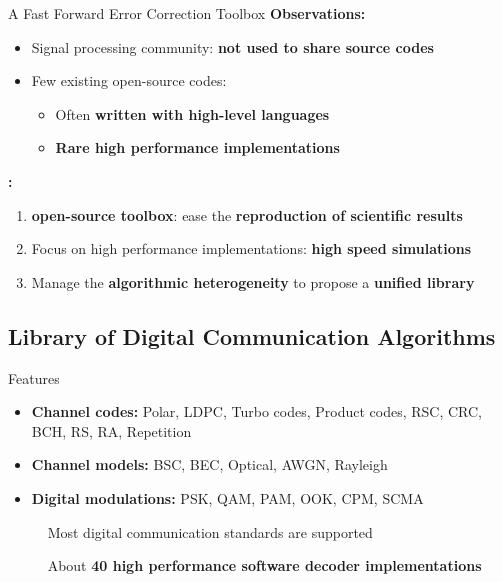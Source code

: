 \begin{frame}{A Fast Forward Error Correction Toolbox}
  \vfill
  \textbf{Observations:}

  \vspace{0.1cm}
  \begin{itemize}
    \item Signal processing community: \textbf{not used to share source codes}
    \item Few existing open-source codes:
    \begin{itemize}
      \item Often \textbf{written with high-level languages}
      \item \textbf{Rare high performance implementations}
    \end{itemize}
  \end{itemize}

  \vfill
  \pause
  \textbf{\AFFECT:}

  \vspace{0.1cm}
  \begin{enumerate}
    \item \Cxx \textbf{open-source toolbox}: ease the \textbf{reproduction of scientific results}
    \pause
    \item Focus on high performance implementations: \textbf{high speed simulations}
    \pause
    \item Manage the \textbf{algorithmic heterogeneity} to propose a \textbf{unified library}
  \end{enumerate}
  \vfill
\end{frame}

\subsection[Library of Digital Communication Algorithms]{Library of Digital Communication Algorithms}

\begin{frame}{Features}
  \vfill
  \begin{itemize}
    \item \textbf{Channel codes:} Polar, LDPC, Turbo codes, Product codes, RSC, CRC, BCH, RS, RA, Repetition
    \vspace{0.1cm}
    \item \textbf{Channel models:} BSC, BEC, Optical, AWGN, Rayleigh
    \vspace{0.1cm}
    \item \textbf{Digital modulations:} PSK, QAM, PAM, OOK, CPM, SCMA
  \end{itemize}
  \vfill
  \pause

  \vspace*{.5em}
  ~~~~~{\color{bleuUni}\Large\MVRightarrow} Most digital communication standards are supported

  \vspace*{.5em}
  ~~~~~{\color{bleuUni}\Large\MVRightarrow} About \textbf{40 high performance software decoder implementations}
  \vfill
\end{frame}

